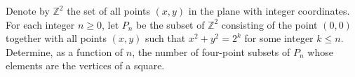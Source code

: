 Denote by $\mathbb{Z}^2$ the set of all points $(x,y)$ in the plane with integer coordinates. For each integer $n \geq 0$, let $P_n$ be the subset of $\mathbb{Z}^2$ consisting of the point $(0,0)$ together with all points $(x,y)$ such that $x^2 + y^2 = 2^k$ for some integer $k \leq n$. Determine, as a function of $n$, the number of four-point subsets of $P_n$ whose elements are the vertices of a square.
